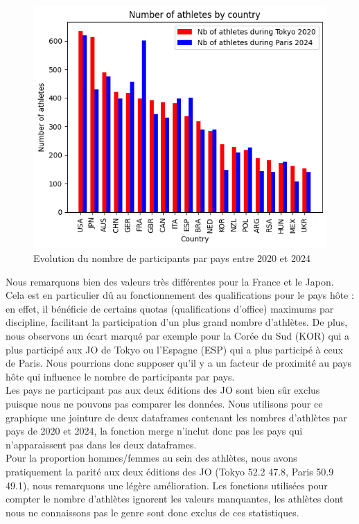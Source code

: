 \documentclass{article}
\begin{document}
\begin{figure}[H]
    \centering
    \includegraphics[width=0.75\linewidth]{assets/nb_participants_by_country.png}
    \caption{Evolution du nombre de participants par pays entre 2020 et 2024}
    \label{fig:enter-label}
\end{figure}

Nous remarquons bien des valeurs très différentes pour la France et le Japon. Cela est en particulier dû au fonctionnement des qualifications pour le pays hôte : en effet, il bénéficie de certains quotas (qualifications d'office) maximums par discipline, facilitant la participation d'un plus grand nombre d'athlètes. De plus, nous observons un écart marqué par exemple pour la Corée du Sud (KOR) qui a plus participé aux JO de Tokyo ou l'Espagne (ESP) qui a plus participé à ceux de Paris. Nous pourrions donc supposer qu'il y a un facteur de proximité au pays hôte qui influence le nombre de participants par pays.
\\

Les pays ne participant pas aux deux éditions des JO sont bien sûr exclus puisque nous ne pouvons pas comparer les données. Nous utilisons pour ce graphique une jointure de deux dataframes contenant les nombres d'athlètes par pays de 2020 et 2024, la fonction merge n'inclut donc pas les pays qui n'apparaissent pas dans les deux dataframes.
\\

Pour la proportion hommes/femmes au sein des athlètes, nous avons pratiquement la parité aux deux éditions des JO (Tokyo 52.2 47.8, Paris 50.9 49.1), nous remarquons une légère amélioration. Les fonctions utilisées pour compter le nombre d'athlètes ignorent les valeurs manquantes, les athlètes dont nous ne connaissons pas le genre sont donc exclus de ces statistiques.
\\
\end{document}
